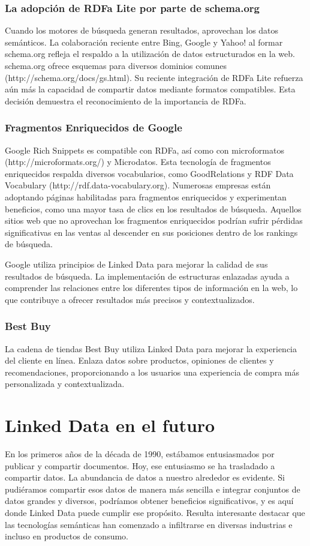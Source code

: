 \documentclass[11pt]{report}
\begin{document}
\subsection*{La adopción de RDFa Lite por parte de schema.org}

		Cuando los motores de búsqueda generan resultados, aprovechan los datos semánticos. La colaboración reciente entre Bing, Google y Yahoo! al formar schema.org refleja el respaldo a la utilización de datos estructurados en la web. schema.org ofrece esquemas para diversos dominios comunes (http://schema.org/docs/gs.html). Su reciente integración de RDFa Lite refuerza aún más la capacidad de compartir datos mediante formatos compatibles. Esta decisión demuestra el reconocimiento de la importancia de RDFa.
\subsection*{Fragmentos Enriquecidos de Google}

		Google Rich Snippets es compatible con RDFa, así como con microformatos (http://microformats.org/) y Microdatos. Esta tecnología de fragmentos enriquecidos respalda diversos vocabularios, como GoodRelations y RDF Data Vocabulary (http://rdf.data-vocabulary.org). Numerosas empresas están adoptando páginas habilitadas para fragmentos enriquecidos y experimentan beneficios, como una mayor tasa de clics en los resultados de búsqueda. Aquellos sitios web que no aprovechan los fragmentos enriquecidos podrían sufrir pérdidas significativas en las ventas al descender en sus posiciones dentro de los rankings de búsqueda.

        Google utiliza principios de Linked Data para mejorar la calidad de sus resultados de búsqueda. La implementación de estructuras enlazadas ayuda a comprender las relaciones entre los diferentes tipos de información en la web, lo que contribuye a ofrecer resultados más precisos y contextualizados.

\subsection*{Best Buy}

		La cadena de tiendas Best Buy utiliza Linked Data para mejorar la experiencia del cliente en línea. Enlaza datos sobre productos, opiniones de clientes y recomendaciones, proporcionando a los usuarios una experiencia de compra más personalizada y contextualizada.

\chapter{Linked Data en el futuro}
En los primeros años de la década de 1990, estábamos entusiasmados por publicar y compartir documentos. Hoy, ese entusiasmo se ha trasladado a compartir datos. La abundancia de datos a nuestro alrededor es evidente. Si pudiéramos compartir esos datos de manera más sencilla e integrar conjuntos de datos grandes y diversos, podríamos obtener beneficios significativos, y es aquí donde Linked Data puede cumplir ese propósito. Resulta interesante destacar que las tecnologías semánticas han comenzado a infiltrarse en diversas industrias e incluso en productos de consumo.
\end{document}
